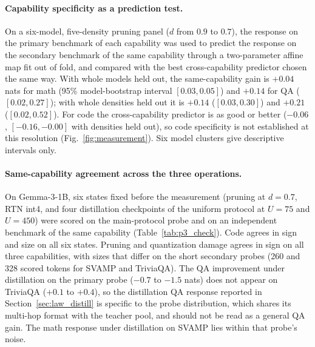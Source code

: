 \paragraph{Capability specificity as a prediction test.} On a
six-model, five-density pruning panel ($d$ from $0.9$ to $0.7$), the
response on the primary benchmark of each capability was used to
predict the response on the secondary benchmark of the same capability
through a two-parameter affine map fit out of fold, and compared with
the best cross-capability predictor chosen the same way. With whole
models held out, the same-capability gain is $+0.04$ nats for math
(95\% model-bootstrap interval $[0.03,0.05]$) and $+0.14$ for QA
($[0.02,0.27]$); with whole densities held out it is $+0.14$
($[0.03,0.30]$) and $+0.21$ ($[0.02,0.52]$). For code the
cross-capability predictor is as good or better ($-0.06$,
$[-0.16,-0.00]$ with densities held out), so code specificity is not
established at this resolution (Fig.~\ref{fig:measurement}). Six model clusters give descriptive
intervals only.



\paragraph{Same-capability agreement across the three operations.} On
Gemma-3-1B, six states fixed before the measurement (pruning at
$d=0.7$, RTN int4, and four distillation checkpoints of the uniform
protocol at $U=75$ and $U=450$) were scored on the main-protocol probe
and on an independent benchmark of the same capability
(Table~\ref{tab:p3_check}). Code agrees in sign and size on all six
states. Pruning and quantization damage agrees in sign on all three
capabilities, with sizes that differ on the short secondary probes
(260 and 328 scored tokens for SVAMP and TriviaQA). The QA improvement
under distillation on the primary probe ($-0.7$ to $-1.5$ nats) does
not appear on TriviaQA ($+0.1$ to $+0.4$), so the distillation QA
response reported in Section~\ref{sec:law_distill} is specific to the
probe distribution, which shares its multi-hop format with the teacher
pool, and should not be read as a general QA gain. The math response
under distillation on SVAMP lies within that probe's noise.



